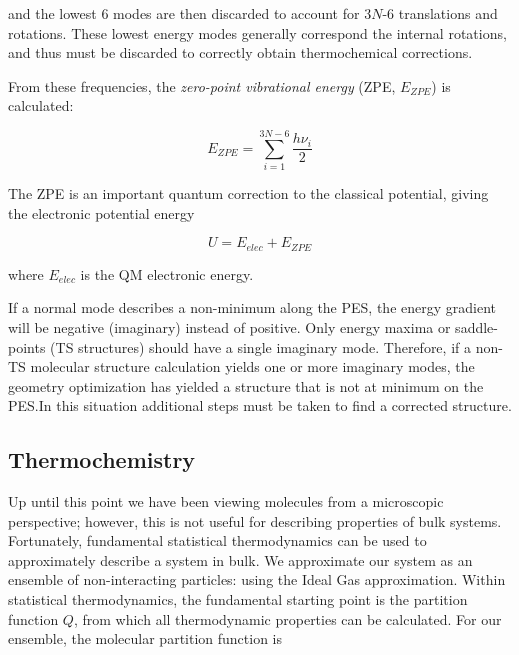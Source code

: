 \noindent and the lowest 6 modes are then discarded to account for 3$N$-6
translations and rotations. These lowest energy modes generally correspond the
internal rotations, and thus must be discarded to correctly obtain
thermochemical corrections.

From these frequencies, the \emph{zero-point vibrational energy} (ZPE,
$E_{ZPE}$) is calculated:

\begin{equation}
  E_{ZPE} = \sum_{i=1}^{3N-6} \frac{h\nu_i}{2}
\end{equation}

\noindent The ZPE is an important quantum correction to the classical
potential, giving the electronic potential energy

\begin{equation}
U = E_{elec} + E_{ZPE}
\end{equation}

\noindent where $E_{elec}$ is the QM electronic energy.

If a normal mode describes a non-minimum along the PES, the energy gradient
will be negative (imaginary) instead of positive. Only energy maxima or
saddle-points (TS structures) should have a single imaginary mode. Therefore,
if a non-TS molecular structure calculation yields one or more imaginary modes,
the geometry optimization has yielded a structure that is not at minimum on
the PES.\@ In this situation additional steps must be taken to find a corrected
structure.

\subsection{Thermochemistry}

Up until this point we have been viewing molecules from a microscopic
perspective; however, this is not useful for describing properties of bulk
systems. Fortunately, fundamental statistical thermodynamics can be used to
approximately describe a system in bulk.\cite{McQuarrie1999,McQuarrie2000} We
approximate our system as an ensemble of non-interacting particles: using the
Ideal Gas approximation. Within statistical thermodynamics, the fundamental
starting point is the partition function $Q$, from which
all thermodynamic properties can be calculated. For our ensemble, the molecular
partition function is


